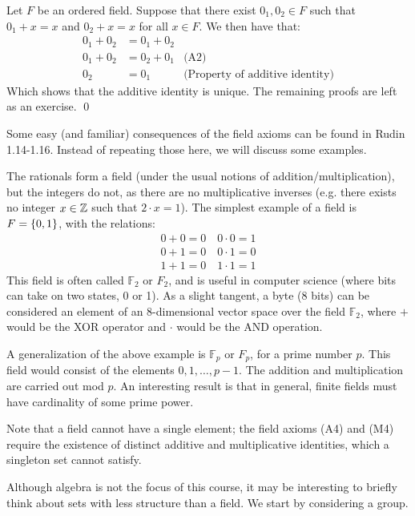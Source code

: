 \begin{nproof}
    Let $F$ be an ordered field. Suppose that there exist $0_1, 0_2 \in F$ such that $0_1 + x= x$ and $0_2 + x = x$ for all $x \in F$. We then have that:
    \begin{align*}
        0_1 + 0_2 &= 0_1 + 0_2
        \\ 0_1 + 0_2 &= 0_2 + 0_1 & \text{(A2)}
        \\ 0_2 &= 0_1 & \text{(Property of additive identity)}
    \end{align*}
    Which shows that the additive identity is unique. The remaining proofs are left as an exercise. \qed
\end{nproof}
\noindent Some easy (and familiar) consequences of the field axioms can be found in Rudin 1.14-1.16. Instead of repeating those here, we will discuss some examples. 

The rationals form a field (under the usual notions of addition/multiplication), but the integers do not, as there are no multiplicative inverses (e.g. there exists no integer $x \in \mathbb{Z}$ such that $2\cdot x = 1$). The simplest example of a field is $F = \set{0, 1}$, with the relations:
\begin{align*}
    0 + 0 = 0\quad 0\cdot0 = 1
    \\ 0 + 1 = 0 \quad 0 \cdot 1 = 0
    \\ 1 + 1 = 0 \quad 1 \cdot 1 = 1
\end{align*}
This field is often called $\mathbb{F}_2$ or $F_2$, and is useful in computer science (where bits can take on two states, 0 or 1). As a slight tangent, a byte (8 bits) can be considered an element of an 8-dimensional vector space over the field $\mathbb{F}_2$, where $+$ would be the XOR operator and $\cdot$ would be the AND operation. 

A generalization of the above example is $\mathbb{F}_p$ or $F_p$, for a prime number $p$. This field would consist of the elements $0, 1, \ldots, p-1$. The addition and multiplication are carried out mod $p$. An interesting result is that in general, finite fields must have cardinality of some prime power. 

Note that a field cannot have a single element; the field axioms (A4) and (M4) require the existence of distinct additive and multiplicative identities, which a singleton set cannot satisfy. 

Although algebra is not the focus of this course, it may be interesting to briefly think about sets with less structure than a field. We start by considering a group. 

